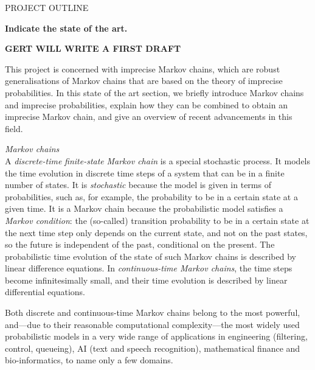 \documentclass[11pt,dvipsnames,usenames,a4paper]{article}
\begin{document}
\newpage
{}

\setcounter{page}{1}

\begin{shaded}\centering PROJECT OUTLINE \end{shaded}


\textbf{Indicate the state of the art.}


{\color{blue}\bf GERT WILL WRITE A FIRST DRAFT}

This project is concerned with imprecise Markov chains, which are robust generalisations of Markov chains that are based on the theory of imprecise probabilities. In this state of the art section, we briefly introduce Markov chains and imprecise probabilities, explain how they can be combined to obtain an imprecise Markov chain, and give an overview of recent advancements in this field.

\vspace{5pt}
\emph{Markov chains}\\[5pt]
A \emph{discrete-time} \emph{finite-state} \emph{Markov chain} is a special stochastic process. 
It models the time evolution in discrete time steps of a system that can be in a finite number of states.
It is \emph{stochastic} because the model is given in terms of probabilities, such as, for example, the probability to be in a certain state at a given time.
It is a Markov chain because the probabilistic model satisfies a \emph{Markov condition}: the (so-called) transition probability to be in a certain state at the next time step only depends on the current state, and not on the past states, so the future is independent of the past, conditional on the present.
The probabilistic time evolution of the state of such Markov chains is described by linear difference equations.
In \emph{continuous-time Markov chains}, the time steps become infinitesimally small, and their time evolution is described by linear differential equations. 

Both discrete and continuous-time Markov chains belong to the most powerful, and---due to their reasonable computational complexity---the most widely used probabilistic models in a very wide range of applications in engineering (filtering, control, queueing), AI (text and speech recognition), mathematical finance and bio-informatics, to name only a few domains.
\end{document}

